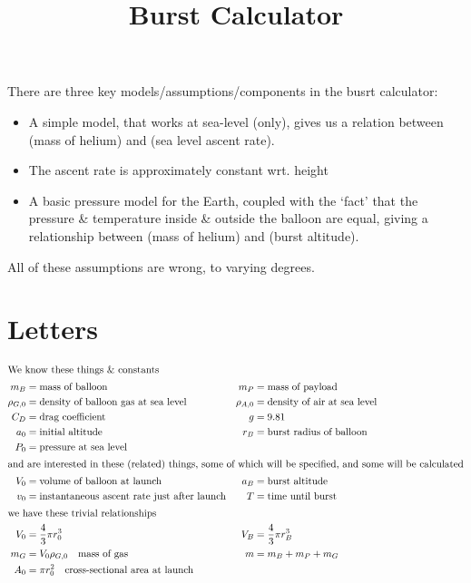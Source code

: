 \documentclass{article}
\begin{document}
\title{Burst Calculator}

There are three key models/assumptions/components in the busrt calculator:

\begin{itemize}
    \item A simple model, that works at sea-level (only), gives us a
          relation between (mass of helium) and (sea level ascent rate).
    \item The ascent rate is approximately constant wrt. height
    \item A basic pressure model for the Earth, coupled with the `fact'
          that the pressure \& temperature inside \& outside the balloon are
          equal, giving a relationship between (mass of helium) and (burst altitude).
\end{itemize}

All of these assumptions are wrong, to varying degrees.

\setcounter{section}{-1}
\section{Letters}

\begin{align*}
\intertext{We know these things \& constants}
    m_B &= \text{mass of balloon} &
    m_P &= \text{mass of payload} \\
    \rho_{G,0} &= \text{density of balloon gas at sea level} &
    \rho_{A,0} &= \text{density of air at sea level } \\
    C_D &= \text{drag coefficient} &
    g &= 9.81 \\
    a_0 &= \text{initial altitude} &
    r_B &= \text{burst radius of balloon} \\
    P_0 &= \text{pressure at sea level} \\
%
\intertext{and are interested in these (related) things, some of which
           will be specified, and some will be calculated}
    V_0 &= \text{volume of balloon at launch} &
    a_B &= \text{burst altitude} \\
    v_0 &= \text{instantaneous ascent rate just after launch} &
    T &= \text{time until burst} \\
%
\intertext{we have these trivial relationships}
    V_0 &= \frac{4}{3} \pi r_0^3 &
    V_B &= \frac{4}{3} \pi r_B^3 \\
    m_G &= V_0 \rho_{G,0} \quad \text{mass of gas} &
    m &= m_B + m_P + m_G \\
    A_0 &= \pi r_0^2 \quad \text{cross-sectional area at launch} \\
%
\end{align*}
\end{document}

